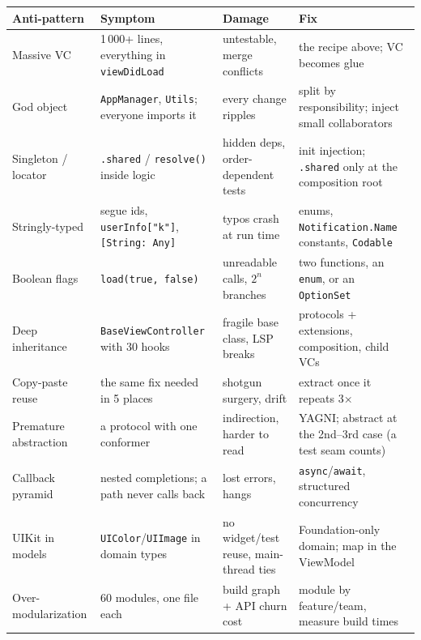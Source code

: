 \documentclass[8pt]{extarticle}
\begin{document}
\vspace{-4pt}
{\footnotesize\setlength\tabcolsep{3pt}
\noindent\begin{tabular}{@{}L{24mm}L{42mm}L{38mm}L{58mm}@{}}
\toprule
\textbf{Anti-pattern} & \textbf{Symptom} & \textbf{Damage} & \textbf{Fix} \\
\midrule
Massive VC & 1\,000+ lines, everything in \texttt{viewDidLoad} & untestable, merge conflicts &
the recipe above; VC becomes glue \\
God object & \texttt{AppManager}, \texttt{Utils}; everyone imports it & every
change ripples & split by responsibility; inject small collaborators \\
Singleton / locator & \texttt{.shared} / \texttt{resolve()} inside logic & hidden deps,
order-dependent tests & init injection; \texttt{.shared} only at the composition root \\
Stringly-typed & segue ids, \texttt{userInfo["k"]}, \texttt{[String: Any]} & typos crash at run
time & enums, \texttt{Notification.Name} constants, \texttt{Codable} \\
Boolean flags & \texttt{load(true, false)} & unreadable calls, $2^n$ branches & two functions,
an \texttt{enum}, or an \texttt{OptionSet} \\
Deep inheritance & \texttt{BaseViewController} with 30 hooks & fragile base class, LSP
breaks & protocols + extensions, composition, child VCs \\
Copy-paste reuse & the same fix needed in 5 places & shotgun surgery, drift & extract once it
repeats 3× \\
Premature abstraction & a protocol with one conformer & indirection, harder
to read & YAGNI; abstract at the 2nd–3rd case (a test seam counts) \\
Callback pyramid & nested completions; a path never calls back & lost errors, hangs &
\texttt{async}/\texttt{await}, structured concurrency \\
UIKit in models & \texttt{UIColor}/\texttt{UIImage} in domain types & no widget/test
reuse, main-thread ties & Foundation-only domain; map in the ViewModel \\
Over-modularization & 60 modules, one file each & build graph + API churn cost &
module by feature/team, measure build times \\
\bottomrule
\end{tabular}}

\end{document}
